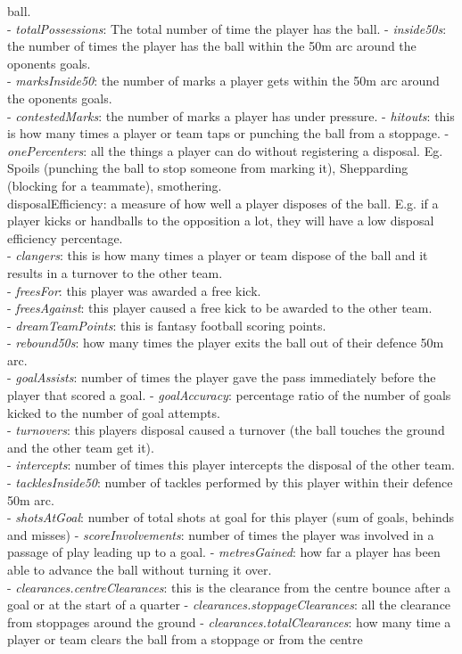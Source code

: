 ball.\\
- \emph{totalPossessions}: The total number of time the player has the
ball. - \emph{inside50s}: the number of times the player has the ball
within the 50m arc around the oponents goals.\\
- \emph{marksInside50}: the number of marks a player gets within the 50m
arc around the oponents goals.\\
- \emph{contestedMarks}: the number of marks a player has under
pressure. - \emph{hitouts}: this is how many times a player or team taps
or punching the ball from a stoppage. - \emph{onePercenters}: all the
things a player can do without registering a disposal. Eg. Spoils
(punching the ball to stop someone from marking it), Shepparding
(blocking for a teammate), smothering.\\
disposalEfficiency: a measure of how well a player disposes of the ball.
E.g. if a player kicks or handballs to the opposition a lot, they will
have a low disposal efficiency percentage.\\
- \emph{clangers}: this is how many times a player or team dispose of
the ball and it results in a turnover to the other team.\\
- \emph{freesFor}: this player was awarded a free kick.\\
- \emph{freesAgainst}: this player caused a free kick to be awarded to
the other team.\\
- \emph{dreamTeamPoints}: this is fantasy football scoring points.\\
- \emph{rebound50s}: how many times the player exits the ball out of
their defence 50m arc.\\
- \emph{goalAssists}: number of times the player gave the pass
immediately before the player that scored a goal. - \emph{goalAccuracy}:
percentage ratio of the number of goals kicked to the number of goal
attempts.\\
- \emph{turnovers}: this players disposal caused a turnover (the ball
touches the ground and the other team get it).\\
- \emph{intercepts}: number of times this player intercepts the disposal
of the other team. - \emph{tacklesInside50}: number of tackles performed
by this player within their defence 50m arc.\\
- \emph{shotsAtGoal}: number of total shots at goal for this player (sum
of goals, behinds and misses) - \emph{scoreInvolvements}: number of
times the player was involved in a passage of play leading up to a goal.
- \emph{metresGained}: how far a player has been able to advance the
ball without turning it over.\\
- \emph{clearances.centreClearances}: this is the clearance from the
centre bounce after a goal or at the start of a quarter -
\emph{clearances.stoppageClearances}: all the clearance from stoppages
around the ground - \emph{clearances.totalClearances}: how many time a
player or team clears the ball from a stoppage or from the centre

